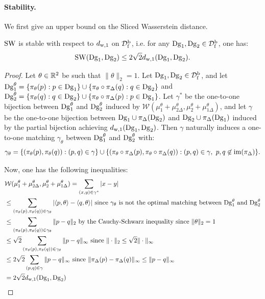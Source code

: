 \paragraph*{Stability.} 
We first give an upper bound on the Sliced Wasserstein distance.

\begin{thm}\label{th:stab}
${\rm SW}$  is stable with respect to $d_{{\rm w},1}$ on ${\mathcal D}_{\rm f}^{\rm b}$, i.e.
for any $\mathrm{Dg}_1,\mathrm{Dg}_2\in {\mathcal D}_{\rm f}^{\rm b}$, one has: $${\rm SW}(\mathrm{Dg}_1,\mathrm{Dg}_2)\leq 2\sqrt{2}d_{{\rm w},1}(\mathrm{Dg}_1,\mathrm{Dg}_2).$$
\end{thm}

\begin{proof}
Let $\theta\in\mathbb{R}^2$ be such that $\|\theta\|_2=1$. Let $\mathrm{Dg}_1,\mathrm{Dg}_2\in {\mathcal D}_{\rm f}^{\rm b}$, and
let $\mathrm{Dg}_1^\theta = \{\pi_\theta(p):p\in \mathrm{Dg}_1\}\cup\{\pi_\theta\circ\pi_\Delta(q):q\in \mathrm{Dg}_2\}$ and 
$\mathrm{Dg}_2^\theta=\{\pi_\theta(q):q\in \mathrm{Dg}_2\}\cup\{\pi_\theta\circ\pi_\Delta(p):p\in \mathrm{Dg}_1\}$. %
Let $\gamma^*$ be the one-to-one bijection between $\mathrm{Dg}_1^\theta$ and $\mathrm{Dg}_2^\theta$
induced by $\mathcal W(\mu_1^\theta+\mu_{2\Delta}^\theta,\mu_2^\theta+\mu_{1\Delta}^\theta)$, and
let $\gamma$ be the 
one-to-one bijection between $\mathrm{Dg}_1\cup\pi_\Delta(\mathrm{Dg}_2)$ and $\mathrm{Dg}_2\cup\pi_\Delta(\mathrm{Dg}_1)$
induced by the partial bijection achieving $d_{{\rm w},1}(\mathrm{Dg}_1,\mathrm{Dg}_2)$.
Then $\gamma$ naturally induces a one-to-one matching $\gamma_\theta$
between $\mathrm{Dg}_1^\theta$ and $\mathrm{Dg}_2^\theta$ with:
$$\gamma_\theta=\{(\pi_\theta(p),\pi_\theta(q)):(p,q)\in\gamma\}\cup
\{(\pi_\theta\circ\pi_\Delta(p),\pi_\theta\circ\pi_\Delta(q)):(p,q)\in\gamma,\ p,q\not\in{\rm im}(\pi_\Delta)\}.$$

Now, one has the following inequalities:
\begin{align}
&\mathcal W(\mu_1^\theta+\mu_{2\Delta}^\theta,\mu_2^\theta+\mu_{1\Delta}^\theta) = \sum_{(x,y)\in\gamma^*} |x-y|\nonumber\\
&\leq \sum_{(\pi_\theta(p),\pi_\theta(q))\in\gamma_\theta} |\langle p,\theta\rangle-\langle q,\theta\rangle|
{\rm\ since\ }
\gamma_\theta{\rm\ is\ not\ the\ optimal\ matching\ between\ }\mathrm{Dg}_1^\theta{\rm\ and\ }\mathrm{Dg}_2^\theta\nonumber\\
&\leq \sum_{(\pi_\theta(p),\pi_\theta(q))\in\gamma_\theta} \|p-q\|_2\text{ by the Cauchy-Schwarz inequality since }\|\theta\|_2=1\nonumber\\
&\leq \sqrt{2}\sum_{(\pi_\theta(p),\pi_\theta(q))\in\gamma_\theta} \|p-q\|_\infty{\rm\ since\ }\|\cdot\|_2\leq\sqrt{2}\|\cdot\|_\infty\nonumber\\
&\leq 2\sqrt{2}\sum_{(p,q)\in\gamma} \|p-q\|_\infty{\rm\ since\ }\|\pi_\Delta(p)-\pi_\Delta(q)\|_\infty \leq \|p-q\|_\infty\nonumber\\
&= 2\sqrt{2}d_{{\rm w},1}(\mathrm{Dg}_1,\mathrm{Dg}_2)\nonumber
\end{align}


\end{proof}
